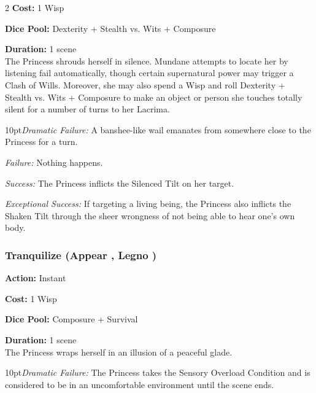 \begin{multicols}{2}
\noindent \textbf{Cost:} 1 Wisp 

\noindent \textbf{Dice Pool:} Dexterity + Stealth vs. Wits + Composure

\noindent \textbf{Duration:} 1 scene \\

\noindent The Princess shrouds herself in silence. Mundane attempts to locate her by listening fail automatically, though certain supernatural power may trigger a Clash of Wills. Moreover, she may also spend a Wisp and roll Dexterity + Stealth vs. Wits + Composure to make an object or person she touches totally silent for a number of turns to her Lacrima. 

\begin{myindentpar}{10pt}\emph{Dramatic Failure:} A banshee-like wail emanates from somewhere close to the Princess for a turn.

    \emph{Failure:} Nothing happens. 

    \emph{Success:} The Princess inflicts the Silenced Tilt on her target. 

    \emph{Exceptional Success:} If targeting a living being, the Princess also inflicts the Shaken Tilt through the sheer wrongness of not being able to hear one's own body. \end{myindentpar}

\subsubsection*{Tranquilize (Appear \textbullet, Legno \textbullet )}

\noindent \textbf{Action:} Instant

\noindent \textbf{Cost:} 1 Wisp 

\noindent \textbf{Dice Pool:} Composure + Survival

\noindent \textbf{Duration:} 1 scene \\

\noindent The Princess wraps herself in an illusion of a peaceful glade. 

\begin{myindentpar}{10pt}\emph{Dramatic Failure:} The Princess takes the Sensory Overload Condition and is considered to be in an uncomfortable environment until the scene ends. 


\end{myindentpar}
\end{multicols}
